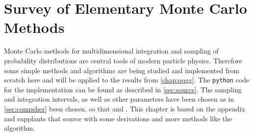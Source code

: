 
\chapter{Survey of Elementary Monte Carlo Methods}%
\label{chap:mc}

Monte Carlo methods for multidimensional integration and sampling of
probability distributions are central tools of modern particle
physics. Therefore some simple methods and algorithms are being
studied and implemented from scratch here and will be applied to the
results from \cref{chap:qqgg}. The \verb|python| code for the
implementation can be found as described in \cref{sec:source}. The
sampling and integration intervals, as well as other parameters have
been chosen as in \cref{sec:compsher} been chosen, so that
 and . This chapter is
based on the appendix~\cite{buckley:2011ge} and supplants that source
with some derivations and more methods like the
\vegas~\cite{Lepage:19781an} algorithm.
